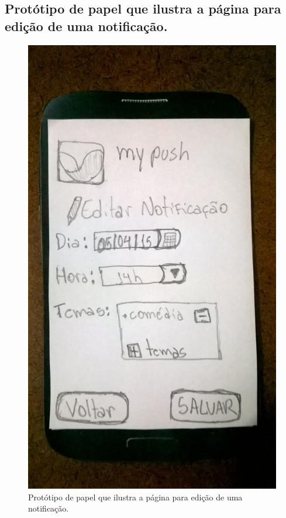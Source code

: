\begin{anexosenv}
    \pagebreak
    \section*{Protótipo de papel que ilustra a página para edição de uma notificação.}
    
      \begin{figure}[!htbp]
	\centering
	\includegraphics[scale=0.32, angle=-90]{editaveis/figuras/prototipo_papel_v1/editar_notificacao}
	\caption{Protótipo de papel que ilustra a página para edição de uma notificação.}
	\label{editar_notificacao_v1}
      \end{figure}
    

\end{anexosenv}
